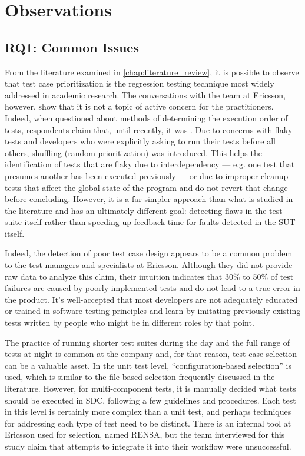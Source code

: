 \section{Observations}
\label{sec:ind_observations}

\subsection{RQ1: Common Issues}
\label{sec:ind_rq1}

From the literature examined in \autoref{chap:literature_review}, it is possible to observe that test case prioritization is the regression testing technique most widely addressed in academic research.
The conversations with the team at Ericsson, however, show that it is not a topic of active concern for the practitioners.
Indeed, when questioned about methods of determining the execution order of tests, respondents claim that, until recently, it was .
Due to concerns with flaky tests and developers who were explicitly asking to run their tests before all others, shuffling (random prioritization) was introduced.
This helps the identification of tests that are flaky due to interdependency — e.g. one test that presumes another has been executed previously — or due to improper cleanup — tests that affect the global state of the program and do not revert that change before concluding.
However, it is a far simpler approach than what is studied in the literature and has an ultimately different goal: detecting flaws in the test suite itself rather than speeding up feedback time for faults detected in the SUT itself.

Indeed, the detection of poor test case design appears to be a common problem to the test managers and specialists at Ericsson.
Although they did not provide raw data to analyze this claim, their intuition indicates that 30\% to 50\% of test failures are caused by poorly implemented tests and do not lead to a true error in the product.
It's well-accepted that most developers are not adequately educated or trained in software testing principles and learn by imitating previously-existing tests written by people who might be in different roles by that point.

The practice of running shorter test suites during the day and the full range of tests at night is common at the company and, for that reason, test case selection can be a valuable asset.
In the unit test level, ``configuration-based selection'' is used, which is similar to the file-based selection frequently discussed in the literature.
However, for multi-component tests, it is manually decided what tests should be executed in SDC, following a few guidelines and procedures.
Each test in this level is certainly more complex than a unit test, and perhaps techniques for addressing each type of test need to be distinct.
There is an internal tool at Ericsson used for selection, named RENSA, but the team interviewed for this study claim that attempts to integrate it into their workflow were unsuccessful.

